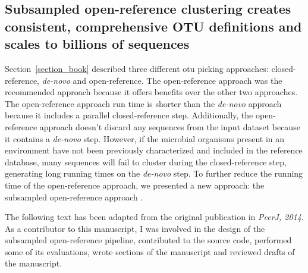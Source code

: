 \subsection{Subsampled open-reference clustering creates consistent, comprehensive OTU definitions and scales to billions of sequences}\label{subsection_openref}

Section~\ref{section_book} \hspace{0.01cm} described \hspace{0.01cm} three \hspace{0.01cm} different \gls{otu} picking approaches:
closed-reference, \emph{de-novo} and open-reference. The open-reference approach
was the recommended approach because it offers benefits over the other two
approaches. The open-reference approach run time is shorter than
the \emph{de-novo} approach because it includes a parallel closed-reference step.
Additionally, the open-reference approach doesn't discard any sequences from
the input dataset because it contains a \emph{de-novo} step. However, if the microbial
organisms present in an environment have not been previously characterized and included
in the reference database, many sequences will fail to cluster
during the closed-reference step, generating long running times on the \emph{de-novo} step.
To further reduce the running time of the open-reference approach, we presented
a new approach: the subsampled open-reference approach \cite{Rideout2014}.

The following text has been adapted from the original publication in
\textsl{PeerJ, 2014}. As a contributor to this manuscript, I was involved in the
design of the subsampled open-reference pipeline, contributed
to the source code, performed some of its evaluations, wrote sections of the
manuscript and reviewed drafts of the manuscript.


